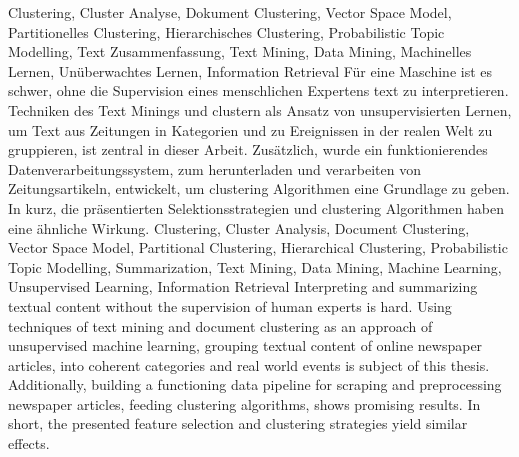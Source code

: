 \HAWAbstractPage
  {
    Clustering, Cluster Analyse, 
    Dokument Clustering, Vector Space Model,
    Partitionelles Clustering,
    Hierarchisches Clustering,
    Probabilistic Topic Modelling, 
    Text Zusammenfassung,
    Text Mining, Data Mining,
    Machinelles Lernen, Unüberwachtes Lernen, 
    Information Retrieval
  }
  { 
    Für eine Maschine ist es schwer, ohne die Supervision eines menschlichen Expertens text zu interpretieren. Techniken des Text Minings und clustern als Ansatz von unsupervisierten Lernen, um Text aus Zeitungen in Kategorien und zu Ereignissen in der realen Welt zu gruppieren, ist zentral in dieser Arbeit. Zusätzlich, wurde ein funktionierendes Datenverarbeitungssystem, zum herunterladen und verarbeiten von Zeitungsartikeln, entwickelt, um clustering Algorithmen eine Grundlage zu geben. In kurz, die präsentierten Selektionsstrategien und clustering Algorithmen haben eine ähnliche Wirkung.
  }
  { 
    Clustering, Cluster Analysis, 
    Document Clustering, Vector Space Model,
    Partitional Clustering,
    Hierarchical Clustering,
    Probabilistic Topic Modelling,
    Summarization,
    Text Mining, Data Mining,
    Machine Learning, Unsupervised Learning, 
    Information Retrieval
  }
  {
    Interpreting and summarizing textual content without the supervision of human experts is hard. Using techniques of text mining and document clustering as an approach of unsupervised machine learning, grouping textual content of online newspaper articles, into coherent categories and real world events is subject of this thesis. Additionally, building a functioning data pipeline for scraping and preprocessing newspaper articles, feeding clustering algorithms, shows promising results. In short, the presented feature selection and clustering strategies yield similar effects.
  }



